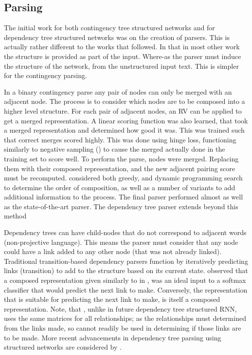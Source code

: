\documentclass[12pt,parskip]{komatufte}
\begin{document}
\subsection{Parsing}
The initial work for both contingency tree structured networks  \parencite{socher2010PhraseEmbedding} and for dependency tree structured networks  was on the creation of parsers.
This is actually rather different to the works that followed.
In that in most other work the structure is provided as part of the input.
Where-as the parser must induce the structure of the network,
from the unstructured input text.
This is simpler for the contingency parsing.

In a binary contingency parse any pair of nodes can only be merged with an adjacent node.
The process is to consider which nodes are to be composed into a higher level structure.
For each pair of adjacent nodes, an RV can be applied to get a merged representation.
A linear scoring function was also learned, that took a merged representation and determined how good it was.
This was trained such that correct merges scored highly.
This was done using hinge loss, functioning similarly to negative sampling () to cause the merged actually done in the training set to score well.
To perform the parse, nodes were merged.
Replacing them with their composed representation, and the new adjacent pairing score must be recomputed.
\textcite{socher2010PhraseEmbedding} considered both greedy, and dynamic programming search to determine the order of composition, as well as a number of variants to add additional information to the process.
The final parser performed almost as well as the state-of-the-art parser.
The dependency tree parser extends beyond this method


Dependency trees can have child-nodes that do not correspond to adjacent words (non-projective language).
This means the parser must consider that any node could have a link added to any other node (that was not already linked).
Traditional transition-based dependency parsers function by iteratively predicting links (transition) to add to the structure based on its current state.
\textcite{stenetorp2013transition}  observed that a composed representation given similarly to in , was an ideal input to a softmax classifier that would predict the next link to make.
Conversely, the representation that is suitable for predicting the next link to make, is itself a composed representation.
Note, that \textcite{stenetorp2013transition}, unlike in future dependency tree structured RNN, uses the same matrices for all relationships; as the relationships must determined from the links made, so cannot readily be used in determining if those links are to be made.
More recent advancements in dependency tree parsing using structured networks are considered by .
\end{document}
